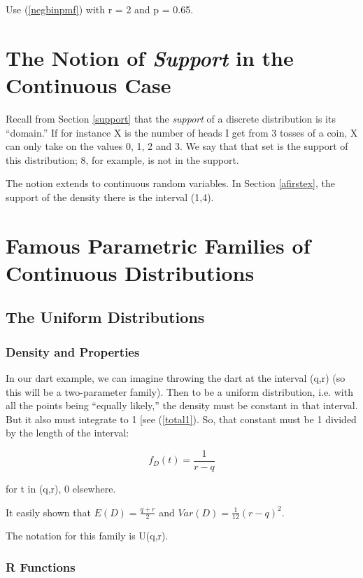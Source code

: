 Use (\ref{negbinpmf}) with r = 2 and p = 0.65.

\section{The Notion of {\it Support} in the Continuous Case}
\label{continsupport}

Recall from Section \ref{support} that the {\it support} of a discrete
distribution is its ``domain.''  If for instance X is the number of
heads I get from 3 tosses of a coin, X can only take on the values 0, 1,
2 and 3.  We say that that set is the support of this distribution; 8,
for example, is not in the support.

The notion extends to continuous random variables.  In Section
\ref{afirstex}, the support of the density there is the interval (1,4).

\section{Famous Parametric Families of Continuous Distributions}

\subsection{The Uniform Distributions}

\subsubsection{Density and Properties}
\label{unifprops} 

In our dart example, we can imagine throwing the dart at the interval
(q,r) (so this will be a two-parameter family).  Then to be a uniform
distribution, i.e. with all the points being ``equally likely,'' the
density must be constant in that interval.  But it also must integrate
to 1 [see (\ref{total1}).  So, that constant must be 1 divided by the
length of the interval:

\begin{equation}
f_D(t) = \frac{1}{r-q} 
\end{equation}

for t in (q,r), 0 elsewhere.  

It easily shown that $E(D) = \frac{q+r}{2}$ and $Var(D) = \frac{1}{12} (r-q)^2$.

The notation for this family is U(q,r).

\subsubsection{R Functions}

